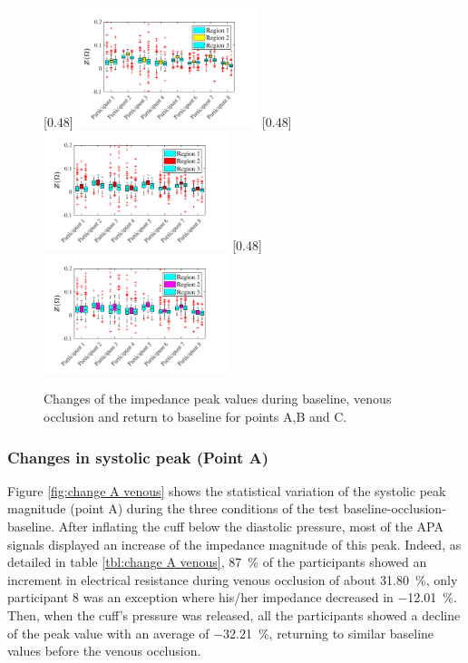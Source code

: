 \begin{figure}
	\null\hfill%
	[0.48\textwidth]{\includegraphics[width=0.48\textwidth, trim={0.5cm 0cm 1.5cm 0 cm}, clip]{figure_apa_3a}}%
	\hfill%
	[0.48\textwidth]{\includegraphics[width=0.48\textwidth, trim={0.5cm 0cm 1.5cm 0 cm}, clip]{figure_apa_3b}}%
	\hfill%
	[0.48\textwidth]{\includegraphics[width=0.48\textwidth, trim={0.5cm 0cm 1.5cm 0 cm}, clip]{figure_apa_3c}}%
	\null%
	\caption{Changes of the impedance peak values during baseline, venous occlusion and return to baseline for points A,B and C.}
	\label{fig:iPG change points venous}
\end{figure}



\subsubsection{Changes in systolic peak (Point A)}
\label{section apa 2.1}
Figure \ref{fig:change A venous} shows the statistical variation of the systolic peak magnitude (point A) during the three conditions of the test baseline-occlusion-baseline. After inflating the cuff below the diastolic pressure, most of the APA signals displayed an increase of the impedance magnitude of this peak. Indeed, as detailed in table \ref{tbl:change A venous}, \SI{87}{\percent} of the participants showed an increment in electrical resistance during venous occlusion of about \SI{31.80}{\percent}, only participant 8 was an exception where his/her impedance decreased in \SI{-12.01}{\percent}. Then, when the cuff's pressure was released, all the participants showed a decline of the peak value with an average of \SI{-32.21}{\percent}, returning to similar baseline values before the venous occlusion. 

